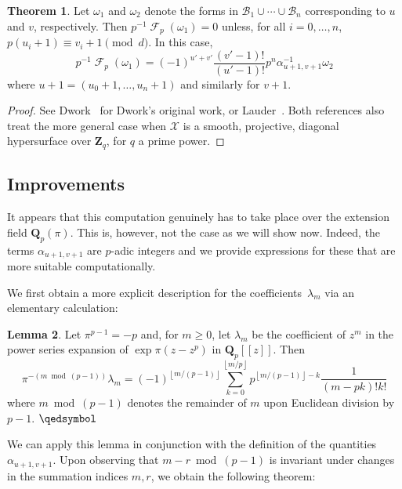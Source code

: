 \documentclass[a4paper,11pt]{article}
\numberwithin{equation}{section}
\providecommand{\floor}[1]{\left\lfloor#1\right\rfloor}   %
\newcommand{\ZZ}{\mathbf{Z}} %
\newcommand{\QQ}{\mathbf{Q}} %
\DeclareMathOperator{\Frob}{\mathcal{F}} %
\providecommand{\cB}{\mathcal{B}} %
\theoremstyle{definition}
\newtheorem{thm}{Theorem}[section]
\newtheorem{lem}[thm]{Lemma}
\begin{document}
\begin{thm} \label{thm:01-03-diagfrob}
Let $\omega_1$ and $\omega_2$ denote the forms in 
$\cB_1 \cup \dotsb \cup \cB_n$ corresponding to $u$ and $v$, 
respectively.  Then $p^{-1} \Frob_p (\omega_1) = 0$ unless, 
for all $i = 0, \dotsc, n$, $p (u_i + 1) \equiv v_i + 1 \pmod{d}$.  
In this case, 
\begin{equation}
p^{-1} \Frob_p (\omega_1) = 
    (-1)^{u' + v'} \frac{(v' - 1)!}{(u' - 1)!} p^n \alpha_{u+1,v+1}^{-1} \omega_2
\end{equation}
where $u + 1 = (u_0 + 1, \dotsc, u_n + 1)$ and similarly for $v + 1$.
\end{thm}

\begin{proof}
See Dwork~\citep[\S 4]{Dwork1964} for Dwork's original work, or 
Lauder~\citep[\S 6.1]{Lauder2004b}.  Both references also treat the 
more general case when $\mathcal{X}$ is a smooth, projective, 
diagonal hypersurface over $\ZZ_q$, for $q$ a prime power.
\end{proof}

\subsection{Improvements}

It appears that this computation genuinely has to take place over 
the extension field $\QQ_p(\pi)$.  This is, however, not the case 
as we will show now.  Indeed, the terms $\alpha_{u+1,v+1}$ are $p$-adic 
integers and we provide expressions for these that are more suitable 
computationally.

We first obtain a more explicit description for the coefficients~$\lambda_m$ 
via an elementary calculation:

\begin{lem} \label{lem:lambdam}
Let $\pi^{p-1} = -p$ and, for $m \geq 0$, let $\lambda_m$ 
be the coefficient of $z^m$ in the power series expansion 
of $\exp \pi (z - z^p)$ in $\QQ_p[[z]]$.  Then 
\begin{equation}
\pi^{- (m \bmod{(p-1)})} \lambda_m = (-1)^{\floor{m/(p-1)}} \sum_{k=0}^{\floor{m/p}} p^{\floor{m/(p-1)} - k} \frac{1}{(m-pk)! k!}
\end{equation}
where $m \bmod{(p-1)}$ denotes the remainder of $m$ upon Euclidean 
division by $p-1$. \hfill $\qedsymbol$
\end{lem}

We can apply this lemma in conjunction with the definition 
of the quantities $\alpha_{u+1, v+1}$.  Upon observing that 
$m - r \bmod{(p-1)}$ is invariant under changes in the summation 
indices $m, r$, we obtain the following theorem:
\end{document}
